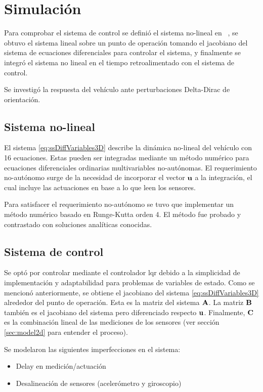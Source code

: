 \section{Simulación}

Para comprobar el sistema de control se definió el sistema no-lineal en \Matlab~, se obtuvo el sistema lineal sobre un punto de operación tomando el jacobiano del sistema de ecuaciones diferenciales para controlar el sistema, y finalmente se integró el sistema no lineal en el tiempo retroalimentado con el sistema de control.

Se investigó la respuesta del vehículo ante perturbaciones Delta-Dirac de orientación.

\subsection{Sistema no-lineal}

El sistema \eqref{eq:ssDiffVariables3D} describe la dinámica no-lineal del vehículo con 16 ecuaciones. Estas pueden ser integradas mediante un método numérico para ecuaciones diferenciales ordinarias multivariables no-autónomas. El requerimiento no-autónomo surge de la necesidad de incorporar el vector $\mathbf{u}$ a la integración, el cual incluye las actuaciones en base a lo que leen los sensores. 

Para satisfacer el requerimiento no-autónomo se tuvo que implementar un método numérico basado en Runge-Kutta orden 4. El método fue probado y contrastado con soluciones analíticas conocidas.

\subsection{Sistema de control}

Se optó por controlar mediante el controlador \gls{lqr} debido a la simplicidad de implementación y adaptabilidad para problemas de variables de estado. Como se mencionó anteriormente, se obtiene el jacobiano del sistema \eqref{eq:ssDiffVariables3D} alrededor del punto de operación. Esta es la matriz del sistema $\mathbf{A}$. La matriz $\mathbf{B}$ también es el jacobiano del sistema pero diferenciado respecto $\mathbf{u}$. Finalmente, $\mathbf{C}$ es la combinación lineal de las mediciones de los sensores (ver sección \ref{sec:model2d} para entender el proceso). 

Se modelaron las siguientes imperfecciones en el sistema:

\begin{itemize}
    \item Delay en medición/actuación
    \item Desalineación de sensores (acelerómetro y giroscopio)
\end{itemize}

